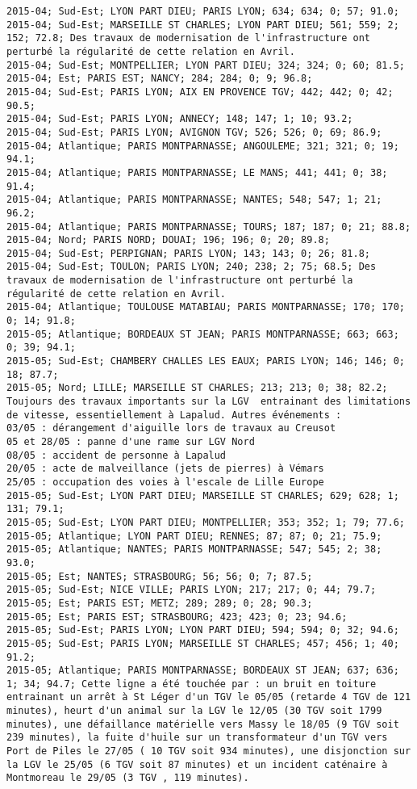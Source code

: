 \documentclass{article}
\begin{document}
\begin{Verbatim}[commandchars=\\\{\}]
2015-04; Sud-Est; LYON PART DIEU; PARIS LYON; 634; 634; 0; 57; 91.0; 
2015-04; Sud-Est; MARSEILLE ST CHARLES; LYON PART DIEU; 561; 559; 2; 152; 72.8; Des travaux de modernisation de l'infrastructure ont perturbé la régularité de cette relation en Avril.
2015-04; Sud-Est; MONTPELLIER; LYON PART DIEU; 324; 324; 0; 60; 81.5; 
2015-04; Est; PARIS EST; NANCY; 284; 284; 0; 9; 96.8; 
2015-04; Sud-Est; PARIS LYON; AIX EN PROVENCE TGV; 442; 442; 0; 42; 90.5; 
2015-04; Sud-Est; PARIS LYON; ANNECY; 148; 147; 1; 10; 93.2; 
2015-04; Sud-Est; PARIS LYON; AVIGNON TGV; 526; 526; 0; 69; 86.9; 
2015-04; Atlantique; PARIS MONTPARNASSE; ANGOULEME; 321; 321; 0; 19; 94.1; 
2015-04; Atlantique; PARIS MONTPARNASSE; LE MANS; 441; 441; 0; 38; 91.4; 
2015-04; Atlantique; PARIS MONTPARNASSE; NANTES; 548; 547; 1; 21; 96.2; 
2015-04; Atlantique; PARIS MONTPARNASSE; TOURS; 187; 187; 0; 21; 88.8; 
2015-04; Nord; PARIS NORD; DOUAI; 196; 196; 0; 20; 89.8; 
2015-04; Sud-Est; PERPIGNAN; PARIS LYON; 143; 143; 0; 26; 81.8; 
2015-04; Sud-Est; TOULON; PARIS LYON; 240; 238; 2; 75; 68.5; Des travaux de modernisation de l'infrastructure ont perturbé la régularité de cette relation en Avril.
2015-04; Atlantique; TOULOUSE MATABIAU; PARIS MONTPARNASSE; 170; 170; 0; 14; 91.8; 
2015-05; Atlantique; BORDEAUX ST JEAN; PARIS MONTPARNASSE; 663; 663; 0; 39; 94.1; 
2015-05; Sud-Est; CHAMBERY CHALLES LES EAUX; PARIS LYON; 146; 146; 0; 18; 87.7; 
2015-05; Nord; LILLE; MARSEILLE ST CHARLES; 213; 213; 0; 38; 82.2; Toujours des travaux importants sur la LGV  entrainant des limitations de vitesse, essentiellement à Lapalud. Autres événements :
03/05 : dérangement d'aiguille lors de travaux au Creusot
05 et 28/05 : panne d'une rame sur LGV Nord
08/05 : accident de personne à Lapalud
20/05 : acte de malveillance (jets de pierres) à Vémars
25/05 : occupation des voies à l'escale de Lille Europe
2015-05; Sud-Est; LYON PART DIEU; MARSEILLE ST CHARLES; 629; 628; 1; 131; 79.1; 
2015-05; Sud-Est; LYON PART DIEU; MONTPELLIER; 353; 352; 1; 79; 77.6; 
2015-05; Atlantique; LYON PART DIEU; RENNES; 87; 87; 0; 21; 75.9; 
2015-05; Atlantique; NANTES; PARIS MONTPARNASSE; 547; 545; 2; 38; 93.0; 
2015-05; Est; NANTES; STRASBOURG; 56; 56; 0; 7; 87.5; 
2015-05; Sud-Est; NICE VILLE; PARIS LYON; 217; 217; 0; 44; 79.7; 
2015-05; Est; PARIS EST; METZ; 289; 289; 0; 28; 90.3; 
2015-05; Est; PARIS EST; STRASBOURG; 423; 423; 0; 23; 94.6; 
2015-05; Sud-Est; PARIS LYON; LYON PART DIEU; 594; 594; 0; 32; 94.6; 
2015-05; Sud-Est; PARIS LYON; MARSEILLE ST CHARLES; 457; 456; 1; 40; 91.2; 
2015-05; Atlantique; PARIS MONTPARNASSE; BORDEAUX ST JEAN; 637; 636; 1; 34; 94.7; Cette ligne a été touchée par : un bruit en toiture entrainant un arrêt à St Léger d'un TGV le 05/05 (retarde 4 TGV de 121 minutes), heurt d'un animal sur la LGV le 12/05 (30 TGV soit 1799 minutes), une défaillance matérielle vers Massy le 18/05 (9 TGV soit 239 minutes), la fuite d'huile sur un transformateur d'un TGV vers Port de Piles le 27/05 ( 10 TGV soit 934 minutes), une disjonction sur la LGV le 25/05 (6 TGV soit 87 minutes) et un incident caténaire à Montmoreau le 29/05 (3 TGV , 119 minutes). 

\end{Verbatim}
\end{document}
